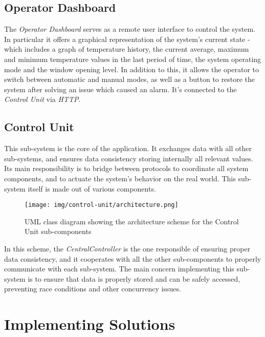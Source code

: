 \documentclass[a4paper,12pt]{report}
\begin{document}
	\section{Operator Dashboard}
	The \textit{Operator Dashboard} serves as a remote user interface to control the system. In particular it offers a graphical representation of the system's current state - which includes a graph of temperature history, the current average, maximum and minimum temperature values in the last period of time, the system operating mode and the window opening level. In addition to this, it allows the operator to switch between automatic and manual modes, as well as a button to restore the system after solving an issue which caused an alarm. It's connected to the \textit{Control Unit} via \textit{HTTP}.
	\section{Control Unit}
	This sub-system is the core of the application. It exchanges data with all other sub-systems, and ensures data consistency storing internally all relevant values. Its main responsibility is to bridge between protocols to coordinate all system components, and to actuate the system's behavior on the real world.
	\newline This sub-system itself is made out of various components.
	\begin{figure}[H]
		\centering{}
		\texttt{[image: img/control-unit/architecture.png]}
		\caption{UML class diagram showing the architecture scheme for the Control Unit sub-components}
		\label{img:control-unit/architecture}
	\end{figure}
	In this scheme, the \textit{CentralController} is the one responsible of ensuring proper data consistency, and it cooperates with all the other sub-components to properly communicate with each sub-system.
	\newline The main concern implementing this sub-system is to ensure that data is properly stored and can be safely accessed, preventing race conditions and other concurrency issues.
	
	\chapter{Implementing Solutions}
\end{document}

